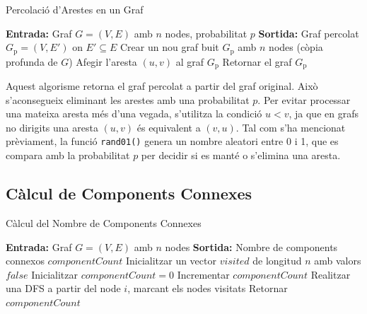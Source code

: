 \documentclass[a4paper]{article}
\begin{document}
	\begin{algorithm} [H]
		\caption{Percolació d'Arestes en un Graf}
		\begin{algorithmic} [1]
			\Statex \textbf{Entrada:} Graf $G = (V, E)$ amb $n$ nodes, probabilitat $p$
			\Statex \textbf{Sortida:} Graf percolat $G_{\text{p}} = (V, E')$ on $E' \subseteq E$
			\Statex \vspace{-0.25em}
			\State Crear un nou graf buit $G_{\text{p}}$ amb $n$ nodes (còpia profunda de $G$)
						\State Afegir l'aresta $(u, v)$ al graf $G_{\text{p}}$
					\EndIf
				\EndFor
			\EndFor
			\State Retornar el graf $G_{\text{p}}$
		\end{algorithmic}
	\end{algorithm}

	Aquest algorisme retorna el graf percolat a partir del graf original. Això s'aconsegueix eliminant les arestes amb una probabilitat $p$. Per evitar processar una mateixa aresta més d'una vegada, s'utilitza la condició $u < v $, ja que en grafs no dirigits una aresta $(u, v)$ és equivalent a $(v, u)$. Tal com s'ha mencionat prèviament, la funció \texttt{rand01()} genera un nombre aleatori entre 0 i 1, que es compara amb la probabilitat $p$ per decidir si es manté o s'elimina una aresta.
	
	\subsection{Càlcul de Components Connexes}
	
	\begin{algorithm} [H]
		\caption{Càlcul del Nombre de Components Connexes}
		\begin{algorithmic} [1]
			\Statex \textbf{Entrada:} Graf $G = (V, E)$ amb $n$ nodes
			\Statex \textbf{Sortida:} Nombre de components connexos $componentCount$
			\Statex \vspace{-0.25em}
			\State Inicialitzar un vector $visited$ de longitud $n$ amb valors $false$
			\State Inicialitzar $componentCount = 0$
					\State Incrementar $componentCount$
					\State Realitzar una DFS a partir del node $i$, marcant els nodes visitats
				\EndIf
			\EndFor
			\State Retornar $componentCount$
		\end{algorithmic}
	\end{algorithm}
	
\end{document}
